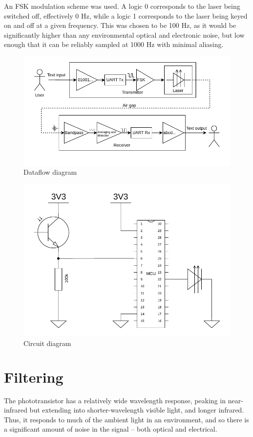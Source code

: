 \documentclass{article}
\begin{document}
\begin{multicols}{2}
An FSK modulation scheme was used. A logic 0 corresponds to the laser being switched off, effectively 0 Hz, while a logic 1 corresponds to the laser being keyed on and off at a given frequency. This was chosen to be 100 Hz, as it would be significantly higher than any environmental optical and electronic noise, but low enough that it can be reliably sampled at 1000 Hz with minimal aliasing.

\begin{figure}[H]
    \includegraphics[width=\linewidth]{figures/dataflow.pdf}
    \caption{Dataflow diagram}
    \label{fig:dataflow}
\end{figure}

\begin{figure}[H]
    \includegraphics[width=\linewidth]{figures/circuit.pdf}
    \caption{Circuit diagram}
    \label{fig:circuit}
\end{figure}

\section{Filtering}
The phototransistor has a relatively wide wavelength response, peaking in near-infrared but extending into shorter-wavelength visible light, and longer infrared. Thus, it responds to much of the ambient light in an environment, and so there is a significant amount of noise in the signal -- both optical and electrical.


\end{multicols}
\end{document}

